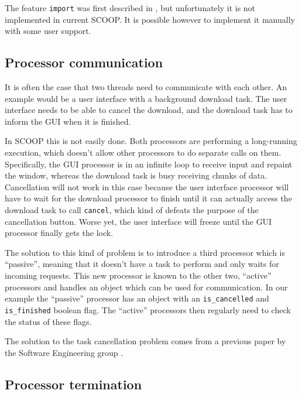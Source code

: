 \documentclass[a4paper,10pt]{article}
\begin{document}
The feature \lstinline!import! was first described in \cite[p. 106]{Nienaltowski07}, but unfortunately it is not implemented in current SCOOP.
It is possible however to implement it manually with some user support.

\subsection{Processor communication}
\label{sec:processor-communication}

It is often the case that two threads need to communicate with each other.
An example would be a user interface with a background download task.
The user interface needs to be able to cancel the download, and the download task has to inform the GUI when it is finished.

In SCOOP this is not easily done.
Both processors are performing a long-running execution, which doesn't allow other processors to do separate calls on them.
Specifically, the GUI processor is in an infinite loop to receive input and repaint the window, whereas the download task is busy receiving chunks of data.
Cancellation will not work in this case because the user interface processor will have to wait for the download processor to finish until it can actually access the download task to call \lstinline!cancel!, 
which kind of defeats the purpose of the cancellation button.
Worse yet, the user interface will freeze until the GUI processor finally gets the lock.

The solution to this kind of problem is to introduce a third processor which is ``passive'', meaning that it doesn't have a task to perform and only waits for incoming requests.
This new processor is known to the other two, ``active'' processors and handles an object which can be used for communication.
In our example the ``passive'' processor has an object with an \lstinline!is_cancelled! and \lstinline!is_finished! boolean flag.
The ``active'' processors then regularly need to check the status of these flags.

The solution to the task cancellation problem comes from a previous paper by the Software Engineering group \cite{paper:task-cancellation}.

\subsection{Processor termination}
\label{sec:processor-termination}
\end{document}
